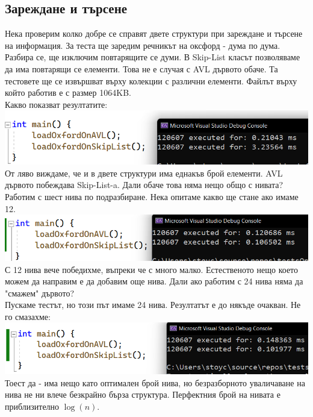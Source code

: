 \documentclass[a4paper,12pt,fleqn]{article}
\begin{document}
	\subsection{Зареждане и търсене}
	Нека проверим колко добре се справят двете структури при зареждане и търсене на информация. За теста ще заредим речникът на оксфорд - дума по дума. Разбира се, ще изключим повтарящите се думи. В Skip-List класът позволяваме да има повтарящи се елементи. Това не е случая с AVL дървото обаче. Та тестовете ще се извършват върху колекции с различни елементи. Файлът върху който работив е с размер 1064KB.\\
	Какво показват резултатите:\\
	\includegraphics[scale=0.4]{oxford-load.png}\\
	От ляво виждаме, че и в двете структури има еднакъв брой елементи. AVL дървото побеждава Skip-List-a. Дали обаче това няма нещо общо с нивата? Работим с шест нива по подразбиране. Нека опитаме какво ще стане ако имаме 12.\\
	\includegraphics[scale=0.4]{oxford-load-2.png}\\
	С 12 нива вече победихме, въпреки че с много малко. Естественото нещо което можем да направим е да добавим още нива. Дали ако работим с 24 нива няма да "смажем" дървото?\\
	Пускаме тестът, но този път имаме 24 нива. Резултатът е до някъде очакван. Не го смазахме:\\
	\includegraphics[scale=0.4]{oxford-load-3.png}\\
	Тоест да - има нещо като оптимален брой нива, но безразборното уваличаване на нива не ни влече безкрайно бърза структура. Перфектния брой на нивата е приблизително $\log(n)$.\\
\end{document}
